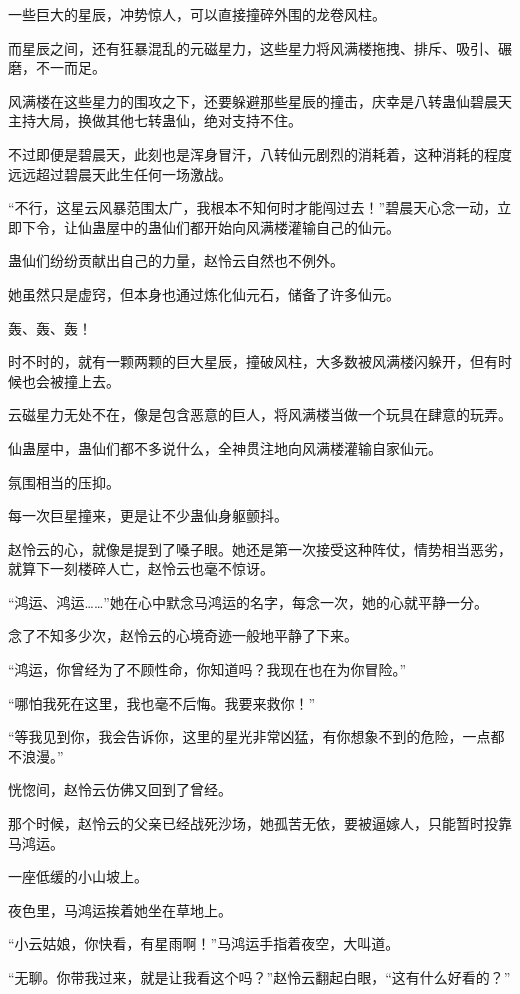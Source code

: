 \begin{this_body}
一些巨大的星辰，冲势惊人，可以直接撞碎外围的龙卷风柱。

而星辰之间，还有狂暴混乱的元磁星力，这些星力将风满楼拖拽、排斥、吸引、碾磨，不一而足。

风满楼在这些星力的围攻之下，还要躲避那些星辰的撞击，庆幸是八转蛊仙碧晨天主持大局，换做其他七转蛊仙，绝对支持不住。

不过即便是碧晨天，此刻也是浑身冒汗，八转仙元剧烈的消耗着，这种消耗的程度远远超过碧晨天此生任何一场激战。

“不行，这星云风暴范围太广，我根本不知何时才能闯过去！”碧晨天心念一动，立即下令，让仙蛊屋中的蛊仙们都开始向风满楼灌输自己的仙元。

蛊仙们纷纷贡献出自己的力量，赵怜云自然也不例外。

她虽然只是虚窍，但本身也通过炼化仙元石，储备了许多仙元。

轰、轰、轰！

时不时的，就有一颗两颗的巨大星辰，撞破风柱，大多数被风满楼闪躲开，但有时候也会被撞上去。

云磁星力无处不在，像是包含恶意的巨人，将风满楼当做一个玩具在肆意的玩弄。

仙蛊屋中，蛊仙们都不多说什么，全神贯注地向风满楼灌输自家仙元。

氛围相当的压抑。

每一次巨星撞来，更是让不少蛊仙身躯颤抖。

赵怜云的心，就像是提到了嗓子眼。她还是第一次接受这种阵仗，情势相当恶劣，就算下一刻楼碎人亡，赵怜云也毫不惊讶。

“鸿运、鸿运……”她在心中默念马鸿运的名字，每念一次，她的心就平静一分。

念了不知多少次，赵怜云的心境奇迹一般地平静了下来。

“鸿运，你曾经为了不顾性命，你知道吗？我现在也在为你冒险。”

“哪怕我死在这里，我也毫不后悔。我要来救你！”

“等我见到你，我会告诉你，这里的星光非常凶猛，有你想象不到的危险，一点都不浪漫。”

恍惚间，赵怜云仿佛又回到了曾经。

那个时候，赵怜云的父亲已经战死沙场，她孤苦无依，要被逼嫁人，只能暂时投靠马鸿运。

一座低缓的小山坡上。

夜色里，马鸿运挨着她坐在草地上。

“小云姑娘，你快看，有星雨啊！”马鸿运手指着夜空，大叫道。

“无聊。你带我过来，就是让我看这个吗？”赵怜云翻起白眼，“这有什么好看的？”


\end{this_body}
